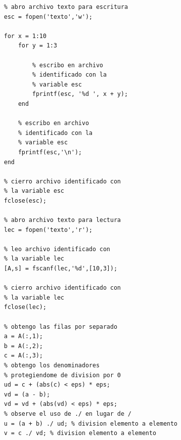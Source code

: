 \begin{enumerate}
\begin{verbatim}
% abro archivo texto para escritura
esc = fopen('texto','w');

for x = 1:10
    for y = 1:3

        % escribo en archivo 
        % identificado con la
        % variable esc
        fprintf(esc, '%d ', x + y);
    end

    % escribo en archivo 
    % identificado con la
    % variable esc
    fprintf(esc,'\n');
end

% cierro archivo identificado con 
% la variable esc
fclose(esc);

% abro archivo texto para lectura
lec = fopen('texto','r');

% leo archivo identificado con 
% la variable lec
[A,s] = fscanf(lec,'%d',[10,3]);

% cierro archivo identificado con 
% la variable lec
fclose(lec);

% obtengo las filas por separado
a = A(:,1);
b = A(:,2);
c = A(:,3);
% obtengo los denominadores 
% protegiendome de division por 0
ud = c + (abs(c) < eps) * eps;
vd = (a - b);
vd = vd + (abs(vd) < eps) * eps;
% observe el uso de ./ en lugar de /
u = (a + b) ./ ud; % division elemento a elemento
v = c ./ vd; % division elemento a elemento
\end{verbatim}

\end{enumerate}

